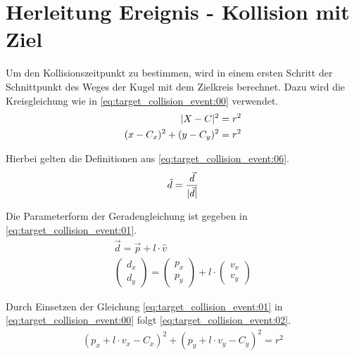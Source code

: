 \section{Herleitung Ereignis - Kollision mit Ziel}\label{anhang:herleitung:event:targetCollision}
Um den Kollisionszeitpunkt zu bestimmen, wird in einem ersten Schritt der Schnittpunkt des Weges der Kugel mit
dem Zielkreis berechnet. Dazu wird die Kreisgleichung wie in \ref{eq:target_collision_event:00} verwendet.
\begin{align}
    \lvert X - C \rvert^2 = r^2\\
    (x - C_x)^2 + (y - C_y)^2 = r^2\label{eq:target_collision_event:00}
\end{align}

Hierbei gelten die Definitionen aus \ref{eq:target_collision_event:06}.
\begin{align}
    \hat{d} = \frac{\vec{d}}{\lvert \vec{d} \rvert}
\end{align}

Die Parameterform der Geradengleichung ist gegeben in \ref{eq:target_collision_event:01}.
\begin{align}
    \vec{d} = \vec{p} + l \cdot \hat{v}\\
    \begin{pmatrix}d_{x}\\d_{y}\end{pmatrix} = \begin{pmatrix}p_{x}\\p_{y}\end{pmatrix} + l \cdot \begin{pmatrix}v_{x}\\v_{y}\end{pmatrix}\label{eq:target_collision_event:01}
\end{align}

Durch Einsetzen der Gleichung \ref{eq:target_collision_event:01} in \ref{eq:target_collision_event:00} folgt \ref{eq:target_collision_event:02}.
\begin{align}
    (p_x + l \cdot v_x - C_x)^2 + (p_y + l \cdot v_y - C_y)^2 = r^2\label{eq:target_collision_event:02}
\end{align}

